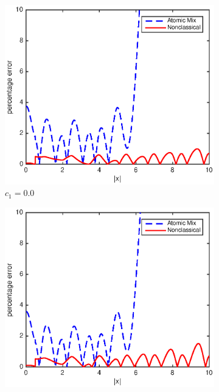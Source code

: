 \documentclass[12pt]{article}
\begin{document}
{\begin{figure}[p]
    \centering
    \begin{subfigure}{0.495\textwidth}
        \centering
        \includegraphics[width=\textwidth]{NSE_err_C00.eps}
        \caption{$c_1 = 0.0$}
        \label{figerrC00}
    \end{subfigure}
    \hfill
    \begin{subfigure}{0.495\textwidth}
        \centering
        \includegraphics[width=\textwidth]{NSE_err_C10.eps}

\end{subfigure}
\end{figure}}
\end{document}
